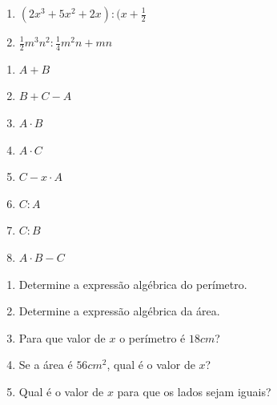 \begin{enumerate}[label=\thesubsection.\arabic*]
\begin{multicols}{2}
\begin{enumerate}[label=\alph*)]
    \item $(2x^3+5x^2+2x) : (x+\frac{1}{2}$
    
    \item $\frac{1}{2}m^3n^2 : \frac{1}{4}m^2n+mn$
\end{enumerate}

\end{multicols}


\begin{multicols}{4}

\begin{enumerate}[label=\alph*)]
    \item $A+B$
    
    \item $B+C-A$
    
    \item $A \cdot B$
    
    \item $A \cdot C$
    
    \item $C - x \cdot A$
    
    \item $C:A$
    
    \item $C:B$
    
    \item $A \cdot B-C$
\end{enumerate}

\end{multicols}


\begin{enumerate}[label=\alph*)]
\item Determine a expressão algébrica do perímetro.

\item Determine a expressão algébrica da área.

\item Para que valor de $x$ o perímetro é $18cm$?

\item Se a área é $56cm^2$, qual é o valor de $x$?

\item Qual é o valor de $x$ para que os lados sejam iguais?
\end{enumerate}


\end{enumerate}
